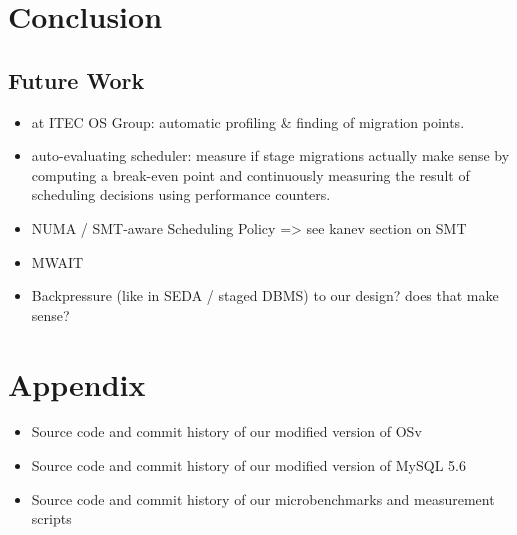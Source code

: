 \documentclass[12pt,a4paper]{book}
\begin{document}
\chapter{Conclusion}\label{ch:concl}
\blindtext
\section{Future Work}
\begin{itemize}
    \item at ITEC OS Group: automatic profiling \& finding of migration points.
    \item auto-evaluating scheduler: measure if stage migrations actually make sense by computing a break-even point and continuously measuring the result of scheduling decisions using performance counters.
    \item NUMA / SMT-aware Scheduling Policy => see kanev section on SMT
    \item MWAIT
    \item Backpressure (like in SEDA / staged DBMS) to our design? does that make sense?
\end{itemize}

\backmatter

\chapter{Appendix}
\blindtext
\begin{itemize}
    \item Source code and commit history of our modified version of OSv
    \item Source code and commit history of our modified version of MySQL 5.6
    \item Source code and commit history of our microbenchmarks and measurement scripts
\end{itemize}

\cleardoublepage
{}
{}
\printbibliography
\end{document}
